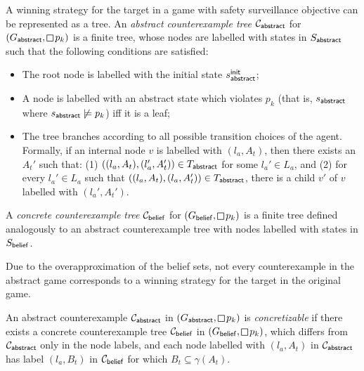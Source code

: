 A winning strategy for the target in a game with safety surveillance objective can be represented as a tree. 
An \emph{abstract counterexample tree} $\mathcal{C}_{\mathsf{abstract}}$ for $(G_\abstr,\LTLglobally p_k)$ is a finite tree,  whose nodes are labelled with states in $S_{\mathsf{abstract}}$ such that the following conditions are satisfied:
\begin{itemize}
\item The root node is labelled with the initial state $s_{\mathsf{abstract}}^{\mathsf{init}}$;
\item A node is labelled with an abstract state  which violates $p_k$ (that is, $s_{\mathsf{abstract}}$ where $s_{\mathsf{abstract}} \not\models p_k$) iff it is a leaf;
\item The tree branches according to all possible transition choices of the agent. Formally, if an internal node $v$ is labelled with $(l_a,A_t)$, then there exists an $A_t'$  such that: (1) $((l_a,A_t),(l_a',A_t')) \in T_{\mathsf{abstract}}$ for some $l_a' \in L_a$, and (2) for every $l_a' \in L_a$ such that $((l_a,A_t),(l_a,A_t')) \in T_{\mathsf{abstract}}$, there is a child $v'$ of $v$ labelled with $(l_a',A_t')$.
\end{itemize}


A \emph{concrete counterexample tree} $\mathcal{C}_{\mathsf{belief}}$ for $(G_\belief,\LTLglobally p_k)$ is a finite tree defined analogously to an abstract counterexample tree with nodes labelled with states in $S_{\mathsf{belief}}$.

Due to the overapproximation of the belief sets, not every counterexample in the abstract game corresponds to a winning strategy for the target in the original game.

An abstract counterexample $\mathcal{C}_{\mathsf{abstract}}$ in $(G_\abstr,\LTLglobally p_k)$ is \emph{concretizable} if there exists a concrete counterexample 
tree $\mathcal{C}_{\mathsf{belief}}$ in $(G_\belief,\LTLglobally p_k)$, which differs from $\mathcal{C}_{\mathsf{abstract}}$ only in the node labels, and each node labelled with $(l_a,A_t)$ in $\mathcal{C}_{\mathsf{abstract}}$ has label $(l_a, B_t)$ in $\mathcal{C}_{\mathsf{belief}}$ for which $B_t \subseteq \gamma(A_t)$.


